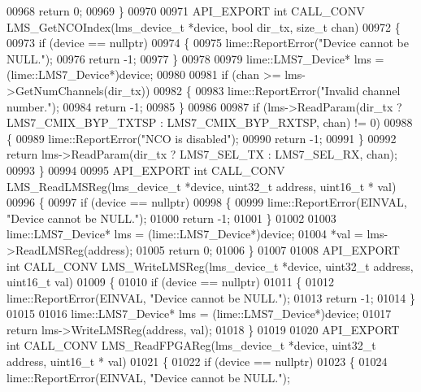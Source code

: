 \begin{DoxyCode}
00968     \textcolor{keywordflow}{return} 0;
00969 \}
00970 
00971 API_EXPORT \textcolor{keywordtype}{int} CALL_CONV LMS_GetNCOIndex(lms_device_t *device, \textcolor{keywordtype}{bool} dir_tx, \textcolor{keywordtype}{size\_t} 
      chan)
00972 \{
00973     \textcolor{keywordflow}{if} (device == \textcolor{keyword}{nullptr})
00974     \{
00975         lime::ReportError(\textcolor{stringliteral}{"Device cannot be NULL."});
00976         \textcolor{keywordflow}{return} -1;
00977     \}
00978 
00979     lime::LMS7_Device* lms = (lime::LMS7_Device*)device;
00980 
00981     \textcolor{keywordflow}{if} (chan >= lms->GetNumChannels(dir\_tx))
00982     \{
00983         lime::ReportError(\textcolor{stringliteral}{"Invalid channel number."});
00984         \textcolor{keywordflow}{return} -1;
00985     \}
00986 
00987     \textcolor{keywordflow}{if} (lms->ReadParam(dir\_tx ? LMS7_CMIX_BYP_TXTSP : LMS7_CMIX_BYP_RXTSP, chan) != 0)
00988     \{
00989         lime::ReportError(\textcolor{stringliteral}{"NCO is disabled"});
00990         \textcolor{keywordflow}{return} -1;
00991     \}
00992     \textcolor{keywordflow}{return} lms->ReadParam(dir\_tx ? LMS7_SEL_TX : LMS7_SEL_RX, chan);
00993 \}
00994 
00995 API_EXPORT \textcolor{keywordtype}{int} CALL_CONV LMS_ReadLMSReg(lms_device_t *device, uint32\_t address, uint16\_t *
      val)
00996 \{
00997     \textcolor{keywordflow}{if} (device == \textcolor{keyword}{nullptr})
00998     \{
00999         lime::ReportError(EINVAL, \textcolor{stringliteral}{"Device cannot be NULL."});
01000         \textcolor{keywordflow}{return} -1;
01001     \}
01002 
01003     lime::LMS7_Device* lms = (lime::LMS7_Device*)device;
01004     *val = lms->ReadLMSReg(address);
01005     \textcolor{keywordflow}{return} 0;
01006 \}
01007 
01008 API_EXPORT \textcolor{keywordtype}{int} CALL_CONV LMS_WriteLMSReg(lms_device_t *device, uint32\_t address, uint16\_t 
      val)
01009 \{
01010     \textcolor{keywordflow}{if} (device == \textcolor{keyword}{nullptr})
01011     \{
01012         lime::ReportError(EINVAL, \textcolor{stringliteral}{"Device cannot be NULL."});
01013         \textcolor{keywordflow}{return} -1;
01014     \}
01015 
01016     lime::LMS7_Device* lms = (lime::LMS7_Device*)device;
01017     \textcolor{keywordflow}{return} lms->WriteLMSReg(address, val);
01018 \}
01019 
01020 API_EXPORT \textcolor{keywordtype}{int} CALL_CONV LMS_ReadFPGAReg(lms_device_t *device, uint32\_t address, uint16\_t *
      val)
01021 \{
01022     \textcolor{keywordflow}{if} (device == \textcolor{keyword}{nullptr})
01023     \{
01024         lime::ReportError(EINVAL, \textcolor{stringliteral}{"Device cannot be NULL."});

\end{DoxyCode}
